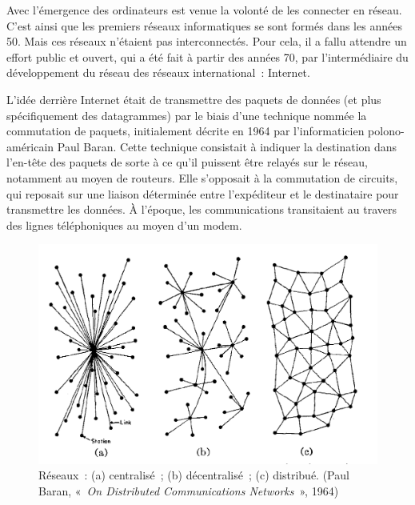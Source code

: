 
Avec l'émergence des ordinateurs est venue la volonté de les connecter en réseau. C'est ainsi que les premiers réseaux informatiques se sont formés dans les années 50. Mais ces réseaux n'étaient pas interconnectés. Pour cela, il a fallu attendre un effort public et ouvert, qui a été fait à partir des années 70, par l'intermédiaire du développement du réseau des réseaux international~: Internet.


L'idée derrière Internet était de transmettre des paquets de données (et plus spécifiquement des datagrammes) par le biais d'une technique nommée la commutation de paquets, initialement décrite en 1964 par l'informaticien polono-américain Paul Baran. Cette technique consistait à indiquer la destination dans l'en-tête des paquets de sorte à ce qu'il puissent être relayés sur le réseau, notamment au moyen de routeurs. Elle s'opposait à la commutation de circuits, qui reposait sur une liaison déterminée entre l'expéditeur et le destinataire pour transmettre les données. À l'époque, les communications transitaient au travers des lignes téléphoniques au moyen d'un modem.


\begin{figure}[h]
  \centering
  \includegraphics[scale=1]{img/baran1964-networks.png}
  \caption{Réseaux~: (a) centralisé~; (b) décentralisé~; (c) distribué. (Paul Baran, «~\emph{On Distributed Communications Networks}~», 1964)}
  \label{fig:baran1964-networks}
\end{figure}

